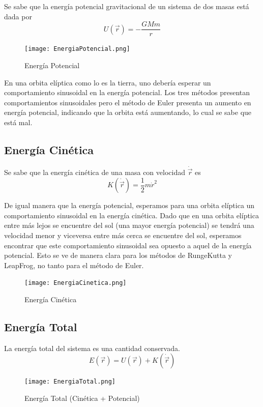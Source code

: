 \documentclass{article}
\begin{document}
Se sabe que la energ\'ia potencial gravitacional de un sistema de dos masas est\'a dada por 
\begin{equation*}
    U(\Vec{r}) = -\frac{GMm}{r} 
\end{equation*}

\begin{figure}[!htbp]
 \centering
  \texttt{[image: EnergiaPotencial.png]}
  \caption{Energ\'ia Potencial}
\end{figure}

En una orbita el\'iptica como lo es la tierra, uno debería esperar un comportamiento sinusoidal en la energ\'ia potencial. Los tres m\'etodos presentan comportamientos sinusoidales pero el m\'etodo de Euler presenta un aumento en energ\'ia potencial, indicando que la orbita est\'a aumentando, lo cual se sabe que est\'a mal.

\subsection*{Energ\'ia Cin\'etica}

Se sabe que la energ\'ia cin\'etica de una masa con velocidad $\dot{\Vec{r}}$ es
\begin{equation*}
    K(\dot{\Vec{r}}) = \frac{1}{2}m \dot{r}^2
\end{equation*}

De igual manera que la energ\'ia potencial, esperamos para una orbita el\'iptica un comportamiento sinusoidal en la energ\'ia cin\'etica. Dado que en una orbita el\'iptica entre m\'as lejos se encuentre del sol (una mayor energ\'ia potencial) se tendr\'a una velocidad menor y viceversa entre m\'as cerca se encuentre del sol, esperamos encontrar que este comportamiento sinusoidal sea opuesto a aquel de la energ\'ia potencial. Esto se ve de manera clara para los m\'etodos de RungeKutta y LeapFrog, no tanto para el m\'etodo de Euler. 

\begin{figure}[!htbp]
 \centering
  \texttt{[image: EnergiaCinetica.png]}
  \caption{Energ\'ia Cin\'etica}
\end{figure}



\subsection*{Energ\'ia Total}


La energ\'ia total del sistema es una cantidad conservada.
\begin{equation*}
    E(\Vec{r}) = U(\Vec{r}) + K(\dot{\Vec{r}})
\end{equation*}
\begin{figure}[!htbp]
 \centering
  \texttt{[image: EnergiaTotal.png]}
  \caption{Energ\'ia Total (Cin\'etica + Potencial)}
\end{figure}
\end{document}
